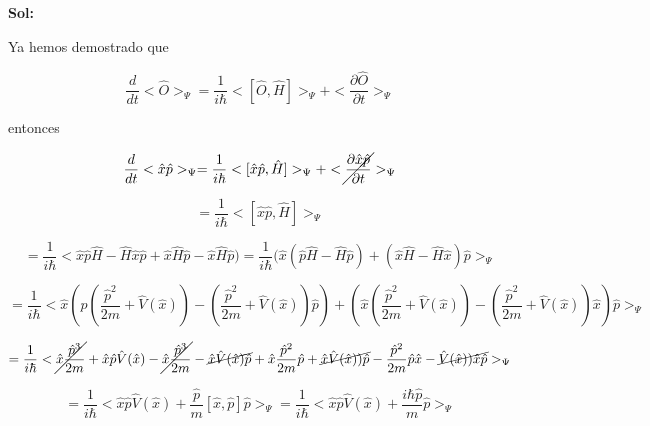 \documentclass[12pt,a4paper]{article}
\begin{document}
\begin{enumerate}
    \textbf{Sol:}
    
    
    Ya hemos demostrado que 
    
    \begin{equation*}
        \frac{d}{dt} <\hat{O}>_\Psi = \frac{1}{i \hbar} <[\hat{O},\hat{H}]>_\Psi + <\frac{\partial \hat{O}}{\partial t}>_\Psi
    \end{equation*}
    
    entonces
    
    \begin{equation*}
        \frac{d}{dt} <\hat{x}\hat{p}>_\Psi = \frac{1}{i \hbar} <[\hat{x}\hat{p},\hat{H}]>_\Psi + <\cancel{\frac{\partial \hat{x}\hat{p}}{\partial t}}>_\Psi
    \end{equation*}
    
    \begin{equation*}
        = \frac{1}{i \hbar} <[\hat{x}\hat{p},\hat{H}]>_\Psi
    \end{equation*}
    
    \begin{equation*}
        = \frac{1}{i \hbar} <\hat{x} \hat{p} \hat{H}-\hat{H}\hat{x} \hat{p} + \hat{x} \hat{H} \hat{p} - \hat{x} \hat{H} \hat{p})= \frac{1}{i \hbar} (\hat{x}(\hat{p}\hat{H} - \hat{H}\hat{p})+(\hat{x}\hat{H}- \hat{H}\hat{x})\hat{p}>_\Psi
    \end{equation*}
    
    \begin{equation*}
        = \frac{1}{i \hbar} <\hat{x}(\hat{p}(\frac{\hat{p}^2}{2m} + \hat{V}(\hat{x})) - (\frac{\hat{p}^2}{2m} + \hat{V}(\hat{x}))\hat{p})+(\hat{x}(\frac{\hat{p}^2}{2m} + \hat{V}(\hat{x}))- (\frac{\hat{p}^2}{2m} + \hat{V}(\hat{x}))\hat{x})\hat{p}>_\Psi
    \end{equation*}
    
    \begin{equation*}
       = \frac{1}{i \hbar} <\cancel{\hat{x}\frac{\hat{p}^3}{2m}} +\hat{x}\hat{p} \hat{V}(\hat{x}) -\cancel{ \hat{x} \frac{\hat{p}^3}{2m}} -\cancel{\hat{x} \hat{V}(\hat{x})\hat{p}
       }+\hat{x}\frac{\hat{p}^2}{2m}\hat{p} + \cancel{\hat{x} \hat{V}(\hat{x}))\hat{p}}- \frac{\hat{p}^2}{2m}\hat{p}\hat{x} - \cancel{\hat{V}(\hat{x}))\hat{x}\hat{p}}>_\Psi
    \end{equation*}
    
    \begin{equation*}
        = \frac{1}{i\hbar} <\hat{x}\hat{p} \hat{V}(\hat{x})+ \frac{\hat{p}}{m}[\hat{x},\hat{p}] \hat{p}>_\Psi =\frac{1}{i\hbar} <\hat{x}\hat{p} \hat{V}(\hat{x})+ \frac{i\hbar\hat{p}}{m} \hat{p}>_\Psi
    \end{equation*}
    

\end{enumerate}
\end{document}
